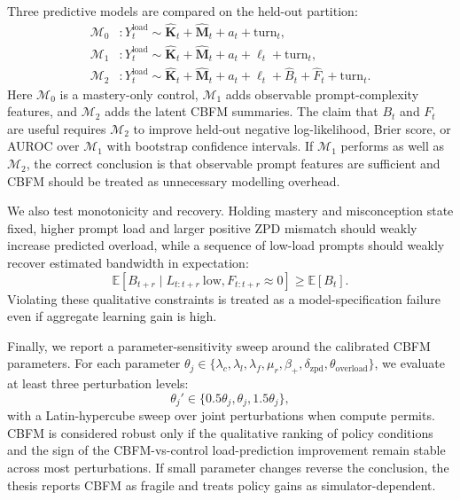 \documentclass[11pt,a4paper]{report}
\begin{document}
Three predictive models are compared on the held-out partition:
\begin{align}
    \mathcal{M}_0 &: Y^{\text{load}}_t \sim
    \hat{\mathbf{K}}_t+\hat{\mathbf{M}}_t+a_t+\text{turn}_t,\\
    \mathcal{M}_1 &: Y^{\text{load}}_t \sim
    \hat{\mathbf{K}}_t+\hat{\mathbf{M}}_t+a_t+\ell_t+\text{turn}_t,\\
    \mathcal{M}_2 &: Y^{\text{load}}_t \sim
    \hat{\mathbf{K}}_t+\hat{\mathbf{M}}_t+a_t+\ell_t+\hat{B}_t+\hat{F}_t+\text{turn}_t.
\end{align}
Here $\mathcal{M}_0$ is a mastery-only control, $\mathcal{M}_1$ adds observable prompt-complexity features, and $\mathcal{M}_2$ adds the latent CBFM summaries. The claim that $B_t$ and $F_t$ are useful requires $\mathcal{M}_2$ to improve held-out negative log-likelihood, Brier score, or AUROC over $\mathcal{M}_1$ with bootstrap confidence intervals. If $\mathcal{M}_1$ performs as well as $\mathcal{M}_2$, the correct conclusion is that observable prompt features are sufficient and CBFM should be treated as unnecessary modelling overhead.

We also test monotonicity and recovery. Holding mastery and misconception state fixed, higher prompt load and larger positive ZPD mismatch should weakly increase predicted overload, while a sequence of low-load prompts should weakly recover estimated bandwidth in expectation:
\begin{equation}
    \mathbb{E}[B_{t+r}\mid L_{t:t+r}\ \text{low}, F_{t:t+r}\approx0]
    \ge
    \mathbb{E}[B_t].
\end{equation}
Violating these qualitative constraints is treated as a model-specification failure even if aggregate learning gain is high.

Finally, we report a parameter-sensitivity sweep around the calibrated CBFM parameters. For each parameter $\theta_j\in\{\lambda_c,\lambda_l,\lambda_f,\mu_r,\beta_+,\delta_{\text{zpd}},\theta_{\text{overload}}\}$, we evaluate at least three perturbation levels:
\begin{equation}
    \theta_j' \in \{0.5\theta_j,\theta_j,1.5\theta_j\},
\end{equation}
with a Latin-hypercube sweep over joint perturbations when compute permits. CBFM is considered robust only if the qualitative ranking of policy conditions and the sign of the CBFM-vs-control load-prediction improvement remain stable across most perturbations. If small parameter changes reverse the conclusion, the thesis reports CBFM as fragile and treats policy gains as simulator-dependent.
\end{document}
